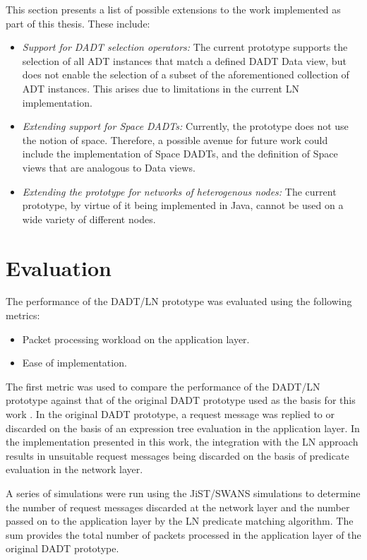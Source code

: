 This section presents a list of possible extensions to the work implemented as
part of this thesis. These include:

\begin{itemize}
  \item \emph{Support for DADT selection operators:} The current prototype
  supports the selection of all ADT instances that match a defined DADT Data
  view, but does not enable the selection of a subset of the aforementioned
  collection of ADT instances. This arises due to limitations in the current LN implementation.
  \item \emph{Extending support for Space DADTs:} Currently, the prototype does
  not use the notion of space. Therefore, a possible avenue for future work
  could include the implementation of Space DADTs, and the definition of Space
  views that are analogous to Data views.
  \item \emph{Extending the prototype for networks of heterogenous nodes:}
  The current prototype, by virtue of it being implemented in Java, cannot be
  used on a wide variety of different nodes. 
\end{itemize}

\section{Evaluation}

The performance of the DADT/LN prototype was evaluated using the following
metrics: 
\begin{itemize}
  \item Packet processing workload on the application layer.
  \item Ease of implementation. 
\end{itemize}

The first metric was used to compare the performance of the DADT/LN prototype
against that of the original DADT prototype used as the basis for this work
\cite{migliavacca_DADT:2006}. In the original DADT prototype, a request message
was replied to or discarded on the basis of an expression tree evaluation in the
application layer. In the implementation presented in this work, the integration
with the LN approach results in unsuitable request messages being discarded on
the basis of predicate evaluation in the network layer. 


A series of simulations were run using the JiST/SWANS simulations to determine
the number of request messages discarded at the network layer and the number
passed on to the application layer by the LN predicate matching algorithm. The
sum provides the total number of packets processed in the application layer of
the original DADT prototype.


